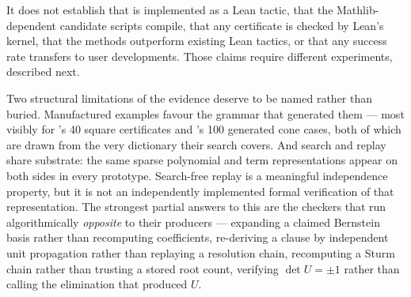 It does not establish that \forge{} is implemented as a Lean tactic, that the
Mathlib-dependent candidate scripts compile, that any certificate is checked by
Lean's kernel, that the methods outperform existing Lean tactics, or that any
success rate transfers to user developments. Those claims require different
experiments, described next.

Two structural limitations of the evidence deserve to be named rather than
buried. Manufactured examples favour the grammar that generated them --- most
visibly for 's 40 square certificates and 's 100 generated cone
cases, both of which are drawn from the very dictionary their search covers. And
search and replay share substrate: the same sparse polynomial and term
representations appear on both sides in every prototype. Search-free replay is a
meaningful independence property, but it is not an independently implemented
formal verification of that representation. The strongest partial answers to
this are the checkers that run algorithmically \emph{opposite} to their
producers --- expanding a claimed Bernstein basis rather than recomputing
coefficients, re-deriving a clause by independent unit propagation rather than
replaying a resolution chain, recomputing a Sturm chain rather than trusting a
stored root count, verifying $\det U=\pm1$ rather than calling the elimination
that produced $U$.
